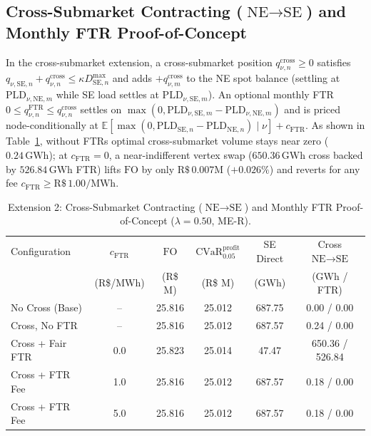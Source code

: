 \documentclass[10pt,journal]{IEEEtran}
\begin{document}
\subsection{Cross-Submarket Contracting ($\text{NE}\to\text{SE}$) and Monthly FTR Proof-of-Concept}
In the cross-submarket extension, a cross-submarket position $q^{\text{cross}}_{\nu,n} \ge 0$ satisfies $q_{\nu,\text{SE},n} + q^{\text{cross}}_{\nu,n} \le \kappa D^{\max}_{\text{SE},n}$ and adds $+q^{\text{cross}}_{\nu,m}$ to the NE spot balance (settling at $\text{PLD}_{\nu,\text{NE},m}$ while SE load settles at $\text{PLD}_{\nu,\text{SE},m}$). An optional monthly FTR $0 \le q^{\text{FTR}}_{\nu,n} \le q^{\text{cross}}_{\nu,n}$ settles on $\max(0, \text{PLD}_{\nu,\text{SE},m} - \text{PLD}_{\nu,\text{NE},m})$ and is priced node-conditionally at $\mathbb{E}[\max(0, \text{PLD}_{\text{SE},n} - \text{PLD}_{\text{NE},n}) \mid \nu] + c_{\text{FTR}}$. As shown in Table~\ref{tab:supp_ftr}, without FTRs optimal cross-submarket volume stays near zero ($0.24\,\text{GWh}$); at $c_{\text{FTR}} = 0$, a near-indifferent vertex swap ($650.36\,\text{GWh}$ cross backed by $526.84\,\text{GWh}$ FTR) lifts $\mathrm{FO}$ by only $\text{R\$}\,0.007\text{M}$ ($+0.026\%$) and reverts for any fee $c_{\text{FTR}} \ge \text{R\$}\,1.00/\text{MWh}$.

\begin{table}[htbp]
\centering
\caption{Extension 2: Cross-Submarket Contracting ($\text{NE}\to\text{SE}$) and Monthly FTR Proof-of-Concept ($\lambda = 0.50$, ME-R).}
\label{tab:supp_ftr}
\scriptsize
\setlength{\tabcolsep}{1.8pt}
\begin{tabular}{lccccc}
\toprule
Configuration & $c_{\text{FTR}}$ & $\mathrm{FO}$ & $\mathrm{CVaR}_{0.05}^{\mathrm{profit}}$ & SE Direct & Cross $\text{NE}\!\to\!\text{SE}$ \\
 & (R\$/MWh) & (R\$ M) & (R\$ M) & (GWh) & (GWh / FTR) \\
\midrule
No Cross (Base) & --  & 25.816 & 25.012 & 687.75 & 0.00 / 0.00 \\
Cross, No FTR   & --  & 25.816 & 25.012 & 687.57 & 0.24 / 0.00 \\
Cross + Fair FTR & 0.0 & 25.823 & 25.014 & 47.47 & 650.36 / 526.84 \\
Cross + FTR Fee  & 1.0 & 25.816 & 25.012 & 687.57 & 0.18 / 0.00 \\
Cross + FTR Fee  & 5.0 & 25.816 & 25.012 & 687.57 & 0.18 / 0.00 \\
\bottomrule
\end{tabular}
\end{table}
\end{document}
